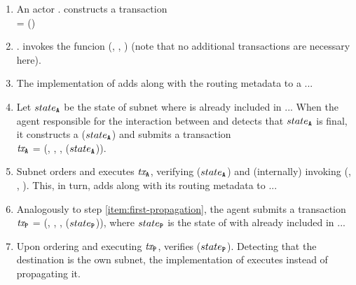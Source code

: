 \begin{enumerate}

    \item An actor . constructs a transaction\\
     = ()

    \item {}. invokes the funcion (, , )
    (note that no additional transactions are necessary here).

    \item The implementation of  adds  along with the routing metadata to a .\gw.\dataField{\postoffice}.

    \item \label{item:first-propagation} Let $state_{\textbf{\texttt{A}}}$ be the state of subnet  where  is already included in .\gw.\dataField{\postoffice}.
    When the \ipc agent responsible for the interaction between  and  detects that $state_{\textbf{\texttt{A}}}$ is final,
    it constructs a {\pof}($state_{\textbf{\texttt{A}}}$) and submits a transaction\\
    $\textit{tx}_{\textbf{\texttt{A}}}$ = (, , , {\pof}($state_{\textbf{\texttt{A}}}$)).

    \item Subnet  orders and executes $\textit{tx}_{\textbf{\texttt{A}}}$, verifying {\pof}($state_{\textbf{\texttt{A}}}$)
    and (internally) invoking (, , ).
    This, in turn, adds  along with its routing metadata to .\gw.\dataField{\postoffice}.

    \item Analogously to step \ref{item:first-propagation}, the \ipc agent submits a transaction\\
    $\textit{tx}_{\textbf{\texttt{P}}}$ = (, , , {\pof}($state_{\textbf{\texttt{P}}}$)),
    where $state_{\textbf{\texttt{P}}}$ is the state of  with  already included in .\gw.\dataField{\postoffice}.

    \item Upon ordering and executing $\textit{tx}_{\textbf{\texttt{P}}}$,  verifies {\pof}($state_{\textbf{\texttt{P}}}$).
    Detecting that the destination is the own subnet, the implementation of  executes  instead of propagating it.

\end{enumerate}

